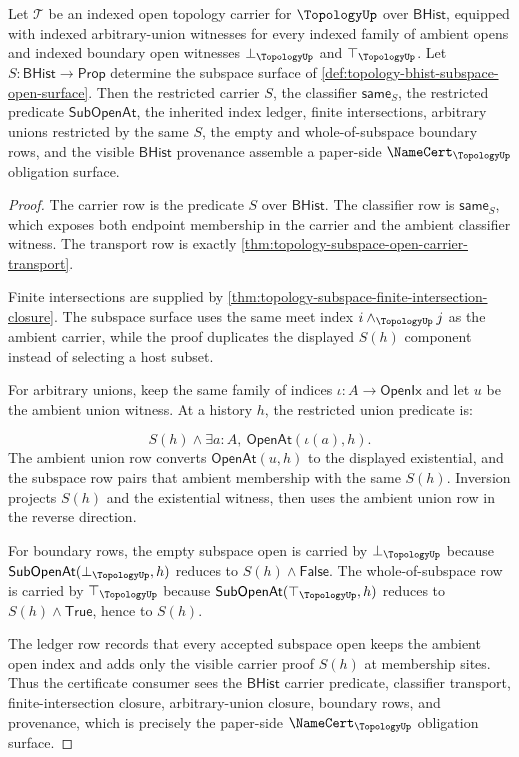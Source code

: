 \begin{theorem}
\label{thm:topology-subspace-namecert-obligation-surface}
Let $\mathcal{T}$ be an indexed open topology carrier for $\TopologyUp$ over $\mathsf{BHist}$, equipped with indexed arbitrary-union witnesses for every indexed family of ambient opens and indexed boundary open witnesses $\bot_{\TopologyUp}$ and $\top_{\TopologyUp}$. Let $S:\mathsf{BHist}\to\mathsf{Prop}$ determine the subspace surface of \autoref{def:topology-bhist-subspace-open-surface}. Then the restricted carrier $S$, the classifier $\mathsf{same}_S$, the restricted predicate $\mathsf{SubOpenAt}$, the inherited index ledger, finite intersections, arbitrary unions restricted by the same $S$, the empty and whole-of-subspace boundary rows, and the visible $\mathsf{BHist}$ provenance assemble a paper-side $\NameCert_{\TopologyUp}$ obligation surface.
\end{theorem}
\begin{proof}
The carrier row is the predicate $S$ over $\mathsf{BHist}$. The classifier row is $\mathsf{same}_S$, which exposes both endpoint membership in the carrier and the ambient classifier witness. The transport row is exactly \autoref{thm:topology-subspace-open-carrier-transport}.

Finite intersections are supplied by \autoref{thm:topology-subspace-finite-intersection-closure}. The subspace surface uses the same meet index $i\wedge_{\TopologyUp}j$ as the ambient carrier, while the proof duplicates the displayed $S(h)$ component instead of selecting a host subset.

For arbitrary unions, keep the same family of indices $\iota:A\to\mathsf{OpenIx}$ and let $u$ be the ambient union witness. At a history $h$, the restricted union predicate is:

$$
S(h)\wedge\exists a:A,\ \mathsf{OpenAt}(\iota(a),h).
$$
The ambient union row converts $\mathsf{OpenAt}(u,h)$ to the displayed existential, and the subspace row pairs that ambient membership with the same $S(h)$. Inversion projects $S(h)$ and the existential witness, then uses the ambient union row in the reverse direction.

For boundary rows, the empty subspace open is carried by $\bot_{\TopologyUp}$ because $\mathsf{SubOpenAt}(\bot_{\TopologyUp},h)$ reduces to $S(h)\wedge\mathsf{False}$. The whole-of-subspace row is carried by $\top_{\TopologyUp}$ because $\mathsf{SubOpenAt}(\top_{\TopologyUp},h)$ reduces to $S(h)\wedge\mathsf{True}$, hence to $S(h)$.

The ledger row records that every accepted subspace open keeps the ambient open index and adds only the visible carrier proof $S(h)$ at membership sites. Thus the certificate consumer sees the $\mathsf{BHist}$ carrier predicate, classifier transport, finite-intersection closure, arbitrary-union closure, boundary rows, and provenance, which is precisely the paper-side $\NameCert_{\TopologyUp}$ obligation surface.
\end{proof}

